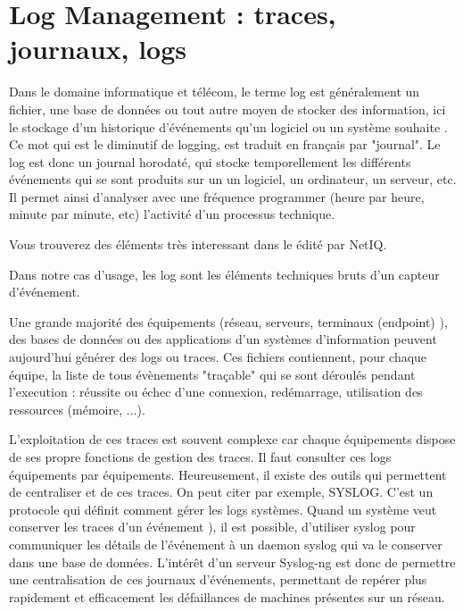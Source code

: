 

\section{Log Management :  traces, journaux, logs}

Dans le domaine informatique et télécom, le terme log est généralement un fichier, une base de données ou tout autre moyen de stocker des information, ici le stockage d'un historique d'événements qu'un logiciel ou un système souhaite . Ce mot qui est le diminutif  de logging, est traduit en français par "journal". Le log est donc un journal horodaté, qui stocke temporellement les différents événements qui se sont produits sur un un logiciel, un ordinateur, un serveur, etc. Il permet ainsi d'analyser avec une fréquence programmer (heure par heure,  minute par minute, etc) l'activité  d'un processus technique.  


Vous trouverez des éléments très interessant  dans le 
 édité par NetIQ.

Dans notre cas d'usage, les log sont les éléments techniques  bruts d'un capteur d'événement.


Une grande majorité des équipements (réseau, serveurs, terminaux (endpoint) ), des bases de données ou des applications d’un systèmes d'information peuvent aujourd’hui générer des logs ou traces.  Ces fichiers contiennent, pour chaque équipe, la liste de tous évènements  "traçable" qui se sont déroulés pendant l'execution : réussite ou échec d’une connexion, redémarrage, utilisation des ressources (mémoire, ...).


L'exploitation de ces traces est souvent complexe car chaque équipements dispose de ses propre fonctions de gestion des traces. Il faut consulter ces logs équipements par équipements. Heureusement, il existe des outils qui permettent de centraliser et de  ces traces.
On peut citer par exemple, SYSLOG. 
C'est un protocole qui définit comment gérer les logs systèmes. Quand un système veut conserver les traces d'un événement ),  il est possible, d'utiliser syslog pour communiquer les détails de l'événement à un daemon syslog qui va le conserver dans une base de données.
L'intérêt d'un serveur Syslog-ng est donc de permettre une centralisation de ces journaux d'événements, permettant de repérer plus rapidement et efficacement les défaillances de machines présentes sur un réseau.


